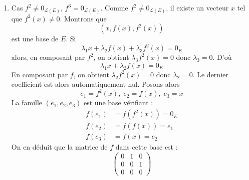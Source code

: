 \begin{enumerate}
\item Cas $f^2\neq 0_{\mathcal L (E)}$, $f^3 = 0_{\mathcal L (E)}$.\newline
Comme $f^2 \neq 0_{\mathcal L (E)}$, il existe un vecteur $x$ tel que $f^2(x)\neq 0$. Montrons que
\begin{displaymath}
 (x,f(x),f^2(x))
\end{displaymath}
est une base de $E$. Si
\begin{displaymath}
 \lambda_1 x + \lambda_2 f(x) +\lambda_3 f^2(x) = 0_E
\end{displaymath}
alors, en composant par $f^2$, on obtient $\lambda_3f^2(x)=0$ donc $\lambda_3=0$. D'où
\begin{displaymath}
 \lambda_1 x + \lambda_2 f(x) = 0_E
\end{displaymath}
En composant par $f$, on obtient $\lambda_2f^2(x)=0$ donc $\lambda_2=0$. Le dernier coefficient est alors automatiquement nul. Posons alors
\begin{displaymath}
 e_1=f^2(x),\; e_2=f(x),\; e_3=x
\end{displaymath}
La famille $(e_1,e_2,e_3)$ est une base vérifiant :
\begin{align*}
 f(e_1)&=f(f^2(x))=0_E\\
f(e_2)&=f(f(x))=e_1\\
f(e_3)&=f(x)=e_2
\end{align*}
On en déduit que la matrice de $f$ dans cette base est :
\begin{displaymath}
\begin{pmatrix}
0 & 1 & 0 \\ 
0 & 0 & 1 \\ 
0 & 0 & 0
\end{pmatrix}
\end{displaymath}

\end{enumerate}
